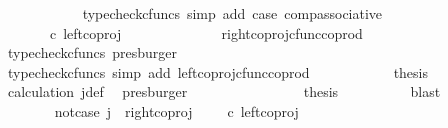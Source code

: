 \begin{isabellebody}
\ \ \ \ \ \ \ \ \ \ \isamarkupfalse%
\ {\isacharparenleft}{\kern0pt}typecheck{\isacharunderscore}{\kern0pt}cfuncs{\isacharcomma}{\kern0pt}\ simp\ add{\isacharcolon}{\kern0pt}\ case{}\ comp{\isacharunderscore}{\kern0pt}associative{}{\isacharparenright}{\kern0pt}\isanewline
\ \ \ \ \ \ \ \ \isamarkupfalse%
\ \isamarkupfalse%
\ {\isachardoublequoteopen}{\isachardot}{\kern0pt}{\isachardot}{\kern0pt}{\isachardot}{\kern0pt}\ {\isacharequal}{\kern0pt}\ {\isacharparenleft}{\kern0pt}{\isasymlangle}{\isasymt}{\isacharcomma}{\kern0pt}\ {\isasymf}{\isasymrangle}\ {\isasymamalg}{\isasymlangle}{\isasymf}{\isacharcomma}{\kern0pt}\ {\isasymt}{\isasymrangle}{\isacharparenright}{\kern0pt}\ {\isasymcirc}\isactrlsub c\ left{\isacharunderscore}{\kern0pt}coproj\ {\isasymone}\ {\isasymone}{\isachardoublequoteclose}\isanewline
\ \ \ \ \ \ \ \ \ \ \isamarkupfalse%
\ right{\isacharunderscore}{\kern0pt}coproj{\isacharunderscore}{\kern0pt}cfunc{\isacharunderscore}{\kern0pt}coprod\ \isamarkupfalse%
\ {\isacharparenleft}{\kern0pt}typecheck{\isacharunderscore}{\kern0pt}cfuncs{\isacharcomma}{\kern0pt}\ presburger{\isacharparenright}{\kern0pt}\isanewline
\ \ \ \ \ \ \ \ \isamarkupfalse%
\ \isamarkupfalse%
\ {\isachardoublequoteopen}{\isachardot}{\kern0pt}{\isachardot}{\kern0pt}{\isachardot}{\kern0pt}\ {\isacharequal}{\kern0pt}\ {\isasymlangle}{\isasymt}{\isacharcomma}{\kern0pt}\ {\isasymf}{\isasymrangle}{\isachardoublequoteclose}\isanewline
\ \ \ \ \ \ \ \ \ \ \isamarkupfalse%
\ {\isacharparenleft}{\kern0pt}typecheck{\isacharunderscore}{\kern0pt}cfuncs{\isacharcomma}{\kern0pt}\ simp\ add{\isacharcolon}{\kern0pt}\ left{\isacharunderscore}{\kern0pt}coproj{\isacharunderscore}{\kern0pt}cfunc{\isacharunderscore}{\kern0pt}coprod{\isacharparenright}{\kern0pt}\isanewline
\ \ \ \ \ \ \ \ \isamarkupfalse%
\ \isamarkupfalse%
\ {\isacharquery}{\kern0pt}thesis\isanewline
\ \ \ \ \ \ \ \ \ \ \isamarkupfalse%
\ calculation\ j{\isacharunderscore}{\kern0pt}def\ \isamarkupfalse%
\ presburger\isanewline
\ \ \ \ \ \ \isamarkupfalse%
\isanewline
\ \ \ \ \ \ \isamarkupfalse%
\ \isamarkupfalse%
\ {\isacharquery}{\kern0pt}thesis\isanewline
\ \ \ \ \ \ \ \ \isamarkupfalse%
\ blast\isanewline
\ \ \ \ \isamarkupfalse%
\isanewline
\ \ \ \ \ \ \isamarkupfalse%
\ not{\isacharunderscore}{\kern0pt}case{}{\isacharcolon}{\kern0pt}\ {\isachardoublequoteopen}j\ {\isasymnoteq}\ right{\isacharunderscore}{\kern0pt}coproj\ {\isasymone}\ {\isacharparenleft}{\kern0pt}{\isasymone}\ {\isasymCoprod}\ {\isasymone}{\isacharparenright}{\kern0pt}\ {\isasymcirc}\isactrlsub c\ left{\isacharunderscore}{\kern0pt}coproj\ {\isasymone}\ {\isasymone}{\isachardoublequoteclose}\isanewline

\end{isabellebody}

